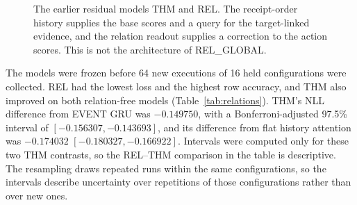 \begin{figure}[htbp]
\centering
{}
\caption[The earlier residual models THM and REL]{The earlier residual models THM and REL. The receipt-order
history supplies the base scores and a query for the target-linked
evidence, and the relation readout supplies a correction to the action
scores. This is not the architecture of REL\_GLOBAL.}
\label{fig:model}
\end{figure}

The models were frozen before 64 new executions of 16 held
configurations were collected. REL had the lowest loss and the highest
row accuracy, and THM also improved on both relation-free models
(Table~\ref{tab:relations}). THM's NLL difference from EVENT GRU was
$-0.149750$, with a Bonferroni-adjusted 97.5\% interval of
$[-0.156307,-0.143693]$, and its difference from flat history attention
was $-0.174032$ $[-0.180327,-0.166922]$.
Intervals were computed only for
these two THM contrasts, so the REL--THM comparison in the table is
descriptive. The resampling draws repeated runs within the same
configurations, so the intervals describe uncertainty over repetitions
of those configurations rather than over new ones.

